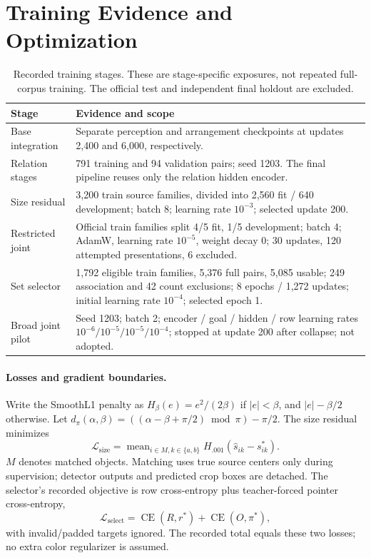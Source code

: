 \section{Training Evidence and Optimization}
\label{app:training}
\begin{table}[H]
\centering\small
\caption{Recorded training stages. These are stage-specific exposures, not repeated full-corpus training. The official test and independent final holdout are excluded.}
\begin{tabularx}{\linewidth}{@{}lY@{}}\toprule
\textbf{Stage} & \textbf{Evidence and scope} \\\midrule
Base integration & Separate perception and arrangement checkpoints at updates 2,400 and 6,000, respectively. \\
Relation stages & 791 training and 94 validation pairs; seed 1203. The final pipeline reuses only the relation hidden encoder. \\
Size residual & 3,200 train source families, divided into 2,560 fit / 640 development; batch 8; learning rate $10^{-3}$; selected update 200. \\
Restricted joint & Official train families split 4/5 fit, 1/5 development; batch 4; AdamW, learning rate $10^{-5}$, weight decay 0; 30 updates, 120 attempted presentations, 6 excluded. \\
Set selector & 1,792 eligible train families, 5,376 full pairs, 5,085 usable; 249 association and 42 count exclusions; 8 epochs / 1,272 updates; initial learning rate $10^{-4}$; selected epoch 1. \\
Broad joint pilot & Seed 1203; batch 2; encoder / goal / hidden / row learning rates $10^{-6}/10^{-5}/10^{-5}/10^{-4}$; stopped at update 200 after collapse; not adopted. \\\bottomrule
\end{tabularx}
\end{table}

\paragraph{Losses and gradient boundaries.}
Write the SmoothL1 penalty as $H_\beta(e)=e^2/(2\beta)$ if $|e|<\beta$, and $|e|-\beta/2$ otherwise. Let $d_\pi(\alpha,\beta)=((\alpha-\beta+\pi/2)\bmod\pi)-\pi/2$. The size residual minimizes
\begin{equation}
 \mathcal L_{\mathrm{size}}=\operatorname{mean}_{i\in M,k\in\{a,b\}}H_{.001}(\hat s_{ik}-s^*_{ik}).
\end{equation}
$M$ denotes matched objects. Matching uses true source centers only during supervision; detector outputs and predicted crop boxes are detached. The selector's recorded objective is row cross-entropy plus teacher-forced pointer cross-entropy,
\begin{equation}
 \mathcal L_{\mathrm{select}}=\operatorname{CE}(R,r^*)+\operatorname{CE}(O,\pi^*),
\end{equation}
with invalid/padded targets ignored. The recorded total equals these two losses; no extra color regularizer is assumed.

